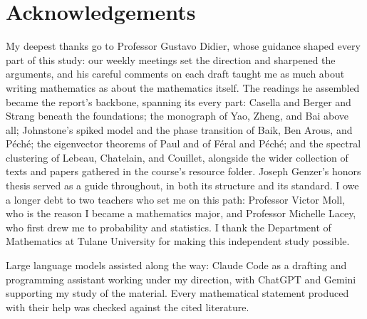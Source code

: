 
\section*{Acknowledgements}

My deepest thanks go to Professor Gustavo Didier, whose guidance shaped every part of this study: our weekly meetings set the direction and sharpened the arguments, and his careful comments on each draft taught me as much about writing mathematics as about the mathematics itself. The readings he assembled became the report's backbone, spanning its every part: Casella and Berger and Strang beneath the foundations; the monograph of Yao, Zheng, and Bai above all; Johnstone's spiked model and the phase transition of Baik, Ben Arous, and P\'ech\'e; the eigenvector theorems of Paul and of F\'eral and P\'ech\'e; and the spectral clustering of Lebeau, Chatelain, and Couillet, alongside the wider collection of texts and papers gathered in the course's resource folder. Joseph Genzer's honors thesis \citep{Genzer2025} served as a guide throughout, in both its structure and its standard. I owe a longer debt to two teachers who set me on this path: Professor Victor Moll, who is the reason I became a mathematics major, and Professor Michelle Lacey, who first drew me to probability and statistics. I thank the Department of Mathematics at Tulane University for making this independent study possible.

Large language models assisted along the way: Claude Code \citep{ClaudeCode2026} as a drafting and programming assistant working under my direction, with ChatGPT \citep{ChatGPT2026} and Gemini \citep{Gemini2026} supporting my study of the material. Every mathematical statement produced with their help was checked against the cited literature.

\clearpage
